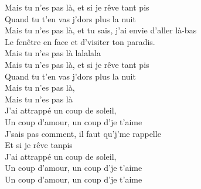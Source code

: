 \documentclass{novel}
\begin{document}
\begin{multicols}{2}
Mais tu n'es pas là, et si je rêve tant pis \\
Quand tu t'en vas j'dors plus la nuit \\
Mais tu n'es pas là, et tu sais, j'ai envie d'aller là-bas \\
Le fenêtre en face et d'visiter ton paradis. \\

Mais tu n'es pas là lalalala \\
Mais tu n'es pas là, et si je rêve tant pis \\
Quand tu t'en vas j'dors plus la nuit \\

Mais tu n'es pas là, \\
Mais tu n'es pas là \\

J'ai attrappé un coup de soleil, \\
Un coup d'amour, un coup d'je t'aime \\
J'sais pas comment, il faut qu'j'me rappelle \\
Et si je rêve tanpis \\

J'ai attrappé un coup de soleil, \\
Un coup d'amour, un coup d'je t'aime \\
Un coup d'amour, un coup d'je t'aime
\end{multicols}
\end{document}
